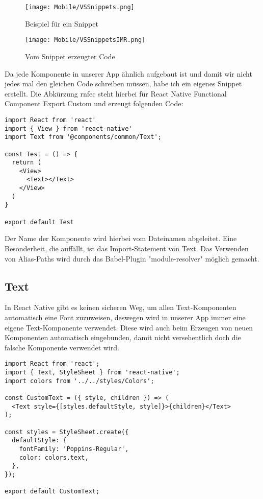 \begin{figure}[H]
  \begin{center}
    \texttt{[image: Mobile/VSSnippets.png]}
    \caption{Beispiel für ein Snippet}
  \end{center}
\end{figure}

\begin{figure}[H]
  \begin{center}
    \texttt{[image: Mobile/VSSnippetsIMR.png]}
    \caption{Vom Snippet erzeugter Code}
  \end{center}
\end{figure}

Da jede Komponente in unserer App ähnlich aufgebaut ist und damit wir nicht jedes mal den gleichen
Code schreiben müssen, habe ich ein eigenes Snippet erstellt. Die Abkürzung rnfec steht hierbei für
React Native Functional Component Export Custom und erzeugt folgenden Code:

\begin{lstlisting}
import React from 'react'
import { View } from 'react-native'
import Text from '@components/common/Text';

const Test = () => {
  return (
    <View>
      <Text></Text>
    </View>
  )
}

export default Test
\end{lstlisting}

Der Name der Komponente wird hierbei vom Dateinamen abgeleitet. Eine Besonderheit, die auffällt, ist
das Import-Statement von Text. Das Verwenden von Alias-Paths wird durch das Babel-Plugin
"module-resolver" möglich gemacht.

\newpage
\subsection{Text}
In React Native gibt es keinen sicheren Weg, um allen Text-Komponenten automatisch eine Font
zuzuweisen, deswegen wird in unserer App immer eine eigene Text-Komponente verwendet. Diese wird
auch beim Erzeugen von neuen Komponenten automatisch eingebunden, damit nicht versehentlich doch die
falsche Komponente verwendet wird.

\begin{lstlisting}
import React from 'react';
import { Text, StyleSheet } from 'react-native';
import colors from '../../styles/Colors';

const CustomText = ({ style, children }) => (
  <Text style={[styles.defaultStyle, style]}>{children}</Text>
);

const styles = StyleSheet.create({
  defaultStyle: {
    fontFamily: 'Poppins-Regular',
    color: colors.text,
  },
});

export default CustomText;
\end{lstlisting}

